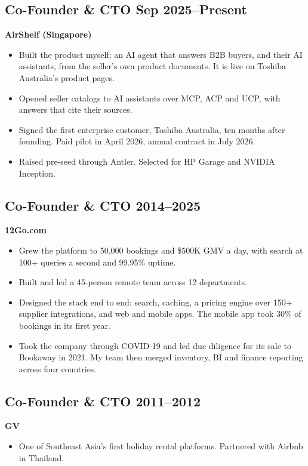 \documentclass[11pt,a4paper]{article}
\begin{document}
\subsection*{Co-Founder \& CTO \hfill Sep 2025--Present}
\textbf{AirShelf (Singapore)}
\begin{itemize}
    \item Built the product myself: an AI agent that answers B2B buyers, and their AI assistants, from the seller's own product documents. It is live on Toshiba Australia's product pages.
    \item Opened seller catalogs to AI assistants over MCP, ACP and UCP, with answers that cite their sources.
    \item Signed the first enterprise customer, Toshiba Australia, ten months after founding. Paid pilot in April 2026, annual contract in July 2026.
    \item Raised pre-seed through Antler. Selected for HP Garage and NVIDIA Inception.
\end{itemize}

\subsection*{Co-Founder \& CTO \hfill 2014--2025}
\textbf{12Go.com} 
\begin{itemize}
    \item Grew the platform to 50,000 bookings and \$500K GMV a day, with search at 100+ queries a second and 99.95\% uptime.
    \item Built and led a 45-person remote team across 12 departments.
    \item Designed the stack end to end: search, caching, a pricing engine over 150+ supplier integrations, and web and mobile apps. The mobile app took 30\% of bookings in its first year.
    \item Took the company through COVID-19 and led due diligence for its sale to Bookaway in 2021. My team then merged inventory, BI and finance reporting across four countries.
\end{itemize}

\subsection*{Co-Founder \& CTO \hfill 2011--2012}
\textbf{GV}
\begin{itemize}
    \item One of Southeast Asia's first holiday rental platforms. Partnered with Airbnb in Thailand.
\end{itemize}
\end{document}
